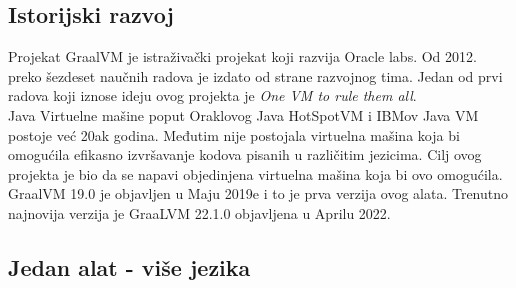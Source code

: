 \documentclass[a4paper]{article}
\begin{document}
\subsection{Istorijski razvoj}
\label{subsec:Istorijski razvoj}

Projekat GraalVM je istraživački projekat koji razvija Oracle labs. Od 2012. preko šezdeset naučnih radova je izdato od strane razvojnog tima. Jedan od prvi radova koji iznose ideju ovog projekta je \textit{One VM to rule them all}. \cite{onevmtorulethemall} \\

Java Virtuelne mašine poput Oraklovog Java HotSpotVM i IBMov Java VM postoje već 20ak godina. Međutim nije postojala virtuelna mašina koja bi omogućila efikasno izvršavanje kodova pisanih u različitim jezicima. Cilj ovog projekta je bio da se napavi objedinjena virtuelna mašina koja bi ovo omogućila.\\

GraalVM 19.0 je objavljen u Maju 2019e i to je prva verzija ovog alata. Trenutno najnovija verzija je GraaLVM 22.1.0 objavljena u Aprilu 2022. \cite{graalvmreleases}



\subsection{Jedan alat - više jezika}
\end{document}
